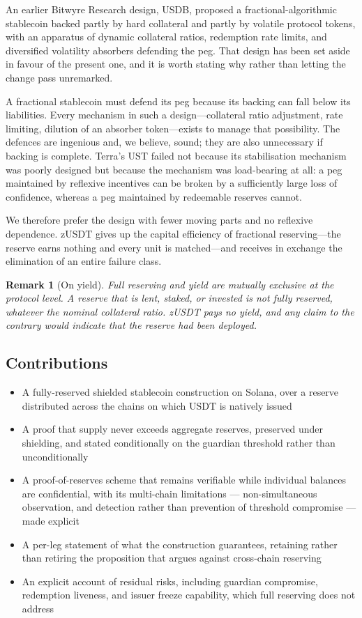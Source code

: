 \documentclass[11pt,a4paper]{article}
\newtheorem{remark}[theorem]{Remark}
\begin{document}
An earlier Bitwyre Research design, USDB, proposed a fractional-algorithmic stablecoin backed partly by hard collateral and partly by volatile protocol tokens, with an apparatus of dynamic collateral ratios, redemption rate limits, and diversified volatility absorbers defending the peg. That design has been set aside in favour of the present one, and it is worth stating why rather than letting the change pass unremarked.

A fractional stablecoin must defend its peg because its backing can fall below its liabilities. Every mechanism in such a design---collateral ratio adjustment, rate limiting, dilution of an absorber token---exists to manage that possibility. The defences are ingenious and, we believe, sound; they are also unnecessary if backing is complete. Terra's UST failed not because its stabilisation mechanism was poorly designed but because the mechanism was load-bearing at all: a peg maintained by reflexive incentives can be broken by a sufficiently large loss of confidence, whereas a peg maintained by redeemable reserves cannot.

We therefore prefer the design with fewer moving parts and no reflexive dependence. zUSDT gives up the capital efficiency of fractional reserving---the reserve earns nothing and every unit is matched---and receives in exchange the elimination of an entire failure class.

\begin{remark}[On yield]
Full reserving and yield are mutually exclusive at the protocol level. A reserve that is lent, staked, or invested is not fully reserved, whatever the nominal collateral ratio. zUSDT pays no yield, and any claim to the contrary would indicate that the reserve had been deployed.
\end{remark}

\subsection{Contributions}

\begin{itemize}
    \item A fully-reserved shielded stablecoin construction on Solana, over a reserve distributed across the chains on which USDT is natively issued
    \item A proof that supply never exceeds aggregate reserves, preserved under shielding, and stated conditionally on the guardian threshold rather than unconditionally
    \item A proof-of-reserves scheme that remains verifiable while individual balances are confidential, with its multi-chain limitations --- non-simultaneous observation, and detection rather than prevention of threshold compromise --- made explicit
    \item A per-leg statement of what the construction guarantees, retaining rather than retiring the proposition that argues against cross-chain reserving
    \item An explicit account of residual risks, including guardian compromise, redemption liveness, and issuer freeze capability, which full reserving does not address
\end{itemize}
\end{document}
